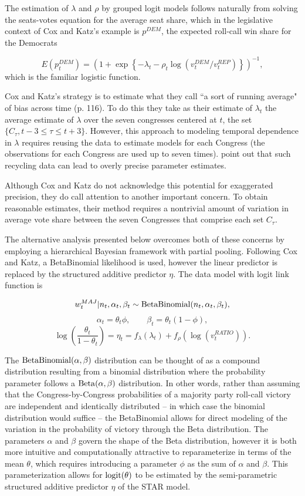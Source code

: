 The estimation of $\lambda$ and $\rho$ by grouped logit models follows naturally from solving the seats-votes equation for the average seat share, which in the legislative context of Cox and Katz's example is $p^{DEM}$, the expected roll-call win share for the Democrats 

{\singlespacing
$$  
  E(p^{DEM}_t)  = \left(1 + \exp{\left\{- \lambda_t - \rho_t \log{\left( v_t^{DEM}/v_t^{REP}  \right)}\right\}}\right)^{-1},
$$
}
%
\noindent which is the familiar logistic function. 

Cox and Katz's strategy is to estimate what they call ``a sort of running average" of bias across time (p. 116). To do this they take as their estimate of $\lambda_t$ the average estimate of $\lambda$ over the seven congresses centered at $t$, the set $\{C_\tau, t-3 \leq \tau \leq t+3\}$. However, this approach to modeling temporal dependence in $\lambda$ requires reusing the data to estimate models for each Congress (the observations for each Congress are used up to seven times).   point out that such recycling data can lead to overly precise parameter estimates. 

Although Cox and Katz do not acknowledge this potential for exaggerated precision, they do call attention to another important concern. To obtain reasonable estimates, their method requires a nontrivial amount of variation in average vote share between the seven Congresses that comprise each set $C_\tau$. 

The alternative analysis presented below overcomes both of these concerns by employing a hierarchical Bayesian framework with partial pooling. Following Cox and Katz, a BetaBinomial likelihood is used, however the linear predictor is replaced by the structured additive predictor $\eta$. The data model with logit link function is 

$$w_t^{MAJ} | n_t, \alpha_t, \beta_t \sim {\rm BetaBinomial}(n_t, \alpha_t, \beta_t),$$
$$ \alpha_t = \theta_t \phi, \qquad \beta_t = \theta_t (1 - \phi),$$
$$ \log\left({\frac{\theta_t}{1 - \theta_t}}\right) = \eta_t = f_{\lambda}(\lambda_t) + f_\rho \left(\log{(v_t^{RATIO})}\right).$$

The ${\rm BetaBinomial}(\alpha,\beta)$ distribution can be thought of as a compound distribution resulting from a binomial distribution where the probability parameter follows a ${\rm Beta}(\alpha,\beta)$ distribution. In other words, rather than assuming that the Congress-by-Congress probabilities of a majority party roll-call victory are independent and identically distributed -- in which case the binomial distribution would suffice -- the BetaBinomial  allows for direct modeling of the variation in the probability of victory through the Beta distribution. The parameters $\alpha$ and $\beta$ govern the shape of the Beta distribution, however it is both more intuitive and computationally attractive to reparameterize in terms of the mean $\theta$, which requires introducing a parameter $\phi$ as the sum of $\alpha$ and $\beta$.  This parameterization allows for ${\rm logit}(\theta)$ to be estimated by the semi-parametric structured additive predictor $\eta$ of the STAR model. 

